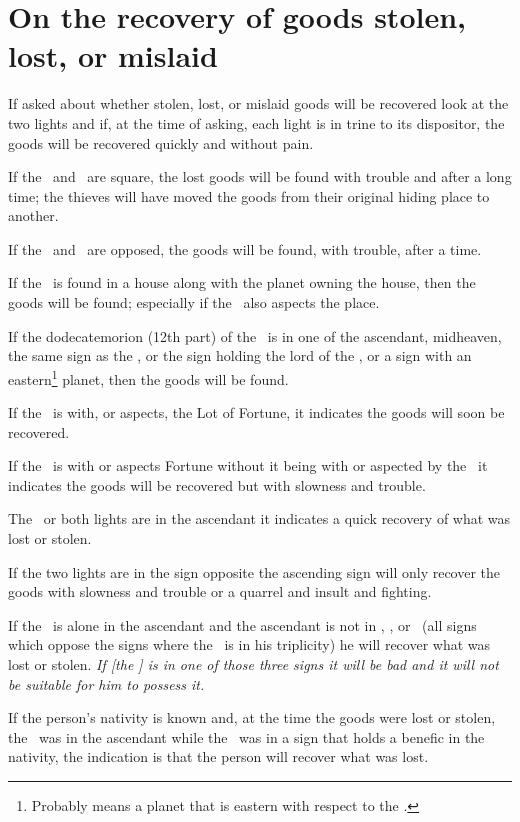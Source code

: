 \section{On the recovery of goods stolen, lost, or mislaid}
If asked about whether stolen, lost, or mislaid goods will be recovered look at the two lights and if, at the time of asking, each light is in trine to its dispositor, the goods will be recovered quickly and without pain.

If the \Sun\, and \Moon\, are square, the lost goods will be found with trouble and after a long time; the thieves will have moved the goods from their original hiding place to another.

If the \Sun\, and \Moon\, are opposed, the goods will be found, with trouble, after a time.

If the \Moon\, is found in a house along with the planet owning the house, then the goods will be found; especially if the \Sun\, also aspects the place.

If the dodecatemorion (12th part) of the \Moon\, is in one of the ascendant, midheaven, the same sign as the \Sun, or the sign holding the lord of the \Moon, or a sign with an eastern\footnote{Probably means a planet that is eastern with respect to the \Sun.} planet, then the goods will be found.

If the \Sun\, is with, or aspects, the Lot of Fortune, it indicates the goods will soon be recovered.

If the \Moon\, is with or aspects Fortune without it being with or aspected by the \Sun\, it indicates the goods will be recovered but with slowness and trouble.

The \Moon\, or both lights are in the ascendant it indicates a quick recovery of what was lost or stolen.

If the two lights are in the sign opposite the ascending sign will only recover the goods with slowness and trouble or a quarrel and insult and fighting.

If the \Sun\, is alone in the ascendant and the ascendant is not in \Aquarius, \Gemini, or \Libra\, (all signs which oppose the signs where the \Sun\, is in his triplicity) he will recover what was lost or stolen. \textsl{If [the \Sun] is in one of those three signs it will be bad and it will not be suitable for him to possess it.}

If the person's nativity is known and, at the time the goods were lost or stolen, the \Sun\, was in the ascendant while the \Moon\, was in a sign that holds a benefic in the nativity, the indication is that the person will recover what was lost.

